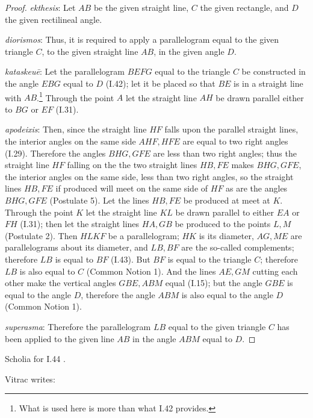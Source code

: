 \documentclass{article}
\begin{document}
\begin{proof}
{\em ekthesis}: Let $AB$ be the given straight line, $C$ the given rectangle, and
$D$ the given rectilineal angle.

{\em diorismos}: Thus, it is required to apply
a parallelogram equal to the given triangle $C$, to the given straight line $AB$, in the
given angle $D$.

{\em kataskeu\={e}}: Let the parallelogram $BEFG$ equal to the triangle $C$
be constructed in the angle $EBG$ equal to $D$ (I.42); let it be placed so that
$BE$ is in a straight line with $AB$.\footnote{What is used here is more than what I.42 provides.}
Through the point $A$ let the straight line $AH$ be drawn parallel either to $BG$ or $EF$ (I.31).

{\em apodeixis}: Then, since the straight line $HF$ falls upon the parallel straight lines,
the interior angles on the same side $AHF,HFE$ are equal to two right angles (I.29).
Therefore the angles $BHG,GFE$ are less than two right angles; thus
the straight line $HF$ falling on the the two straight lines $HB,FE$ 
makes $BHG,GFE$,
the interior angles on the same side, less than two right angles,
so the straight lines $HB,FE$ if produced will meet on the same side of $HF$
as are the angles $BHG,GFE$ (Postulate 5).
Let the lines $HB,FE$ be produced at meet at $K$.
Through the point $K$ let the straight line $KL$ be drawn parallel to either $EA$ or $FH$ (I.31);
then let the straight lines $HA,GB$ be produced to the points $L,M$ (Postulate 2).
Then $HLKF$ be a parallelogram; $HK$ is its diameter, $AG,ME$ are parallelograms about its diameter,
and $LB,BF$ are the so-called complements;
therefore $LB$ is equal to $BF$ (I.43).
But $BF$ is equal to the triangle $C$; therefore $LB$ is also equal to $C$ (Common Notion 1).  
And the lines $AE,GM$ cutting each other make the vertical angles
$GBE,ABM$ equal (I.15); but the angle $GBE$ is equal to the angle $D$,
therefore the angle $ABM$ is also equal to the angle $D$ (Common Notion 1). 

{\em superasma}: Therefore the parallelogram $LB$ equal to the given triangle $C$
has been applied to the given line $AB$ in the angle $ABM$ equal to $D$.
\end{proof}

Scholia for I.44 \cite[pp.~203--207]{euclidisV}.

Vitrac \cite[p.~276]{vitracI} writes:
\end{document}
